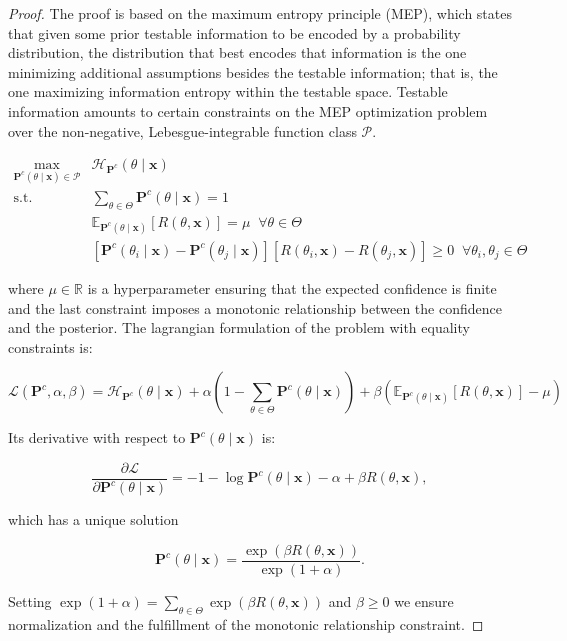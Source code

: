 \begin{proof}
    The proof is based on the maximum entropy principle (MEP), which states that
    given some prior testable information to be encoded by a probability 
    distribution, the distribution that best encodes that information is the one
    minimizing additional assumptions besides the testable information; that is, the one
    maximizing information entropy within the testable space. Testable information amounts to certain constraints on
    the MEP optimization problem over the non-negative, Lebesgue-integrable function class $\mathcal{P}$.

    $$
    \begin{aligned}
        \underset{\mathbf{P}^c(\theta \mid \bm{x}) \in \mathcal{P}}{\operatorname{max}} & \mathcal{H}_{\mathbf{P}^c}(\theta \mid \bm{x}) \\
        \text {s.t.} & \sum_{\theta \in \Theta} \mathbf{P}^c(\theta \mid \bm{x}) = 1 \\
        & \mathbb{E}_{\mathbf{P}^c(\theta \mid \bm{x})}[R(\theta, \bm{x})]=\mu \;\; \forall \theta \in \Theta \\
        & [\mathbf{P}^c(\theta_i \mid \bm{x}) - \mathbf{P}^c(\theta_j \mid \bm{x})][R(\theta_i, \bm{x}) - R(\theta_j, \bm{x})] \geq 0 \;\; \forall \theta_i, \theta_j \in \Theta
    \end{aligned}
    $$

    where $\mu \in \mathbb{R}$ is a hyperparameter ensuring that the expected confidence is finite
    and the last constraint imposes a monotonic relationship between the confidence and the posterior.
    The lagrangian formulation of the problem with equality constraints is:

    $$
        \mathcal{L}(\mathbf{P}^c, \alpha, \beta) = \mathcal{H}_{\mathbf{P}^c}(\theta \mid \bm{x}) + \alpha \left ( 1 - \sum_{\theta \in \Theta} \mathbf{P}^c(\theta \mid \bm{x}) \right ) +
        \beta  \left ( \mathbb{E}_{\mathbf{P}^c(\theta \mid \bm{x})}[R(\theta, \bm{x})] - \mu \right )
    $$

    Its derivative with respect to $\mathbf{P}^c(\theta \mid \bm{x})$ is:

    $$
    \frac{\partial \mathcal{L}}{\partial \mathbf{P}^c(\theta \mid \bm{x})} = -1 - \log \mathbf{P}^c(\theta \mid \bm{x}) - \alpha + \beta R(\theta, \bm{x}),
    $$

    which has a unique solution

    $$
    \mathbf{P}^c(\theta \mid \bm{x}) = \frac{\exp \left ( \beta R(\theta, \bm{x}) \right )}{\exp \left ( 1+ \alpha \right )}.
    $$

    Setting $\exp \left ( 1+ \alpha \right ) = \sum_{\theta \in \Theta} \exp \left ( \beta R(\theta, \bm{x}) \right )$ and $\beta \geq 0$ 
    we ensure normalization and the fulfillment of the monotonic relationship constraint.
\end{proof}

